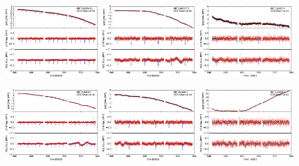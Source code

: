\documentclass[12pt, preprint]{aastex}
\begin{document}
\begin{figure}[p]
\begin{center}
\includegraphics[width=0.32\textwidth]{f5a}
\hfill
\includegraphics[width=0.32\textwidth]{f5b}
\hfill
\includegraphics[width=0.32\textwidth]{f5c}

\includegraphics[width=0.32\textwidth]{f5d}
\hfill
\includegraphics[width=0.32\textwidth]{f5e}
\hfill
\includegraphics[width=0.32\textwidth]{f5f}


\end{center}
\end{figure}
\end{document}
